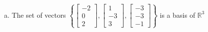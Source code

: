 \begin{exerciseAnswer}
\begin{enumerate}[(a)]
\item The set of vectors \( \left\{ \left[\begin{array}{c}
-2 \\
0 \\
2
\end{array}\right] , \left[\begin{array}{c}
1 \\
-3 \\
3
\end{array}\right] , \left[\begin{array}{c}
-3 \\
-3 \\
-1
\end{array}\right] \right\} \) is a basis of \(\mathbb{R}^3\)
\end{enumerate}
    
\end{exerciseAnswer}
    
